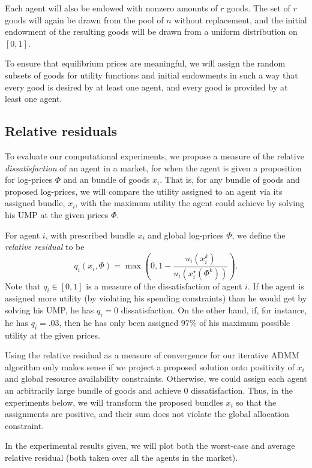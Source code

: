 \documentclass[12pt]{article}
\begin{document}
Each agent will also be endowed with nonzero amounts of $r$
goods.
The set of $r$ goods will again be drawn from the pool of $n$
without replacement, and the initial endowment of
the resulting goods will be drawn from a uniform distribution on
$[0,1]$.

To ensure that equilibrium prices are meaningful,
we will assign the random subsets of goods for utility functions and
initial endowments in such a way that every good is desired by at least one agent, and every good is provided by at least one agent.

\subsection{Relative residuals}
To evaluate our computational experiments, we propose a measure of
the relative \emph{dissatisfaction} of an agent in a market, for when the agent is given a proposition for log-prices $\Phi$ and an bundle of goods
$x_i$.
That is, for any bundle of goods and proposed log-prices, we will compare the
utility assigned to an agent via its assigned bundle, $x_i$, with the maximum utility
the agent could achieve by solving his UMP at the given prices $\Phi$.

For agent $i$, with prescribed bundle $x_i$ and global log-prices $\Phi$,
we define the \emph{relative residual} to be
\[
q_i(x_i, \Phi)= \max\left(0,1-\frac{u_i(x_i^k)}{u_i(x_i^\star(\Phi^k))}\right).
\]
Note that $q_i \in [0,1]$ is a measure of the dissatisfaction of agent $i$.
If the agent is assigned more utility (by violating his spending constraints) than he would get by solving his UMP, he has $q_i = 0$ dissatisfaction.
On the other hand, if, for instance, he has $q_i = .03$, then he has only been assigned $97\%$ of his maximum possible utility at the given prices.

Using the relative residual as a measure of convergence for our iterative ADMM
algorithm only makes sense if we project a proposed solution onto positivity of $x_i$ and
global resource availability constraints.
Otherwise, we could assign each agent an arbitrarily large bundle of goods and achieve 0 dissatisfaction.
Thus, in the experiments below, we will transform the proposed bundles $x_i$ so that the assignments are positive, and their sum does not violate the global allocation constraint.

In the experimental results given, we will plot both the worst-case and average relative residual (both taken over all the agents in the market).
\end{document}
